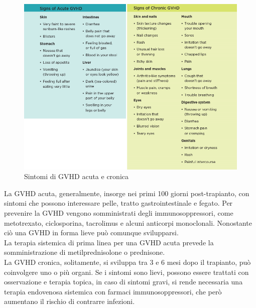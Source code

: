 \begin{figure}[H]
    \begin{center}
    \includegraphics[width=0.9\columnwidth]{img/SignsGVHD.png}
    \vspace{-3mm}
    \end{center}
    \caption{Sintomi di GVHD acuta e cronica
    \cite{img38}}
    \label{fig:FIGURE_3.17}
\end{figure}

La GVHD acuta, generalmente, insorge nei primi 100 giorni post-trapianto, con sintomi che possono interessare pelle, 
tratto gastrointestinale e fegato. Per prevenire la GVHD vengono somministrati degli immunosoppressori, come 
metotrexato, ciclosporina, tacrolimus e alcuni anticorpi monoclonali. 
Nonostante ciò una GVHD in forma lieve può comunque svilupparsi\cite{STEMCELLS}.\\
La terapia sistemica di prima linea per una GVHD acuta prevede la somministrazione di metilprednisolone o prednisone\cite{GVHD}.\\
La GVHD cronica, solitamente, si sviluppa tra 3 e 6 mesi dopo il trapianto, può coinvolgere uno o più organi. 
Se i sintomi sono lievi, possono essere trattati con osservazione e terapia topica, in caso di sintomi gravi, si rende 
necessaria una terapia endovenosa sistemica con farmaci immunosoppressori, che però aumentano il rischio 
di contrarre infezioni\cite{STEMCELLS}.\\

